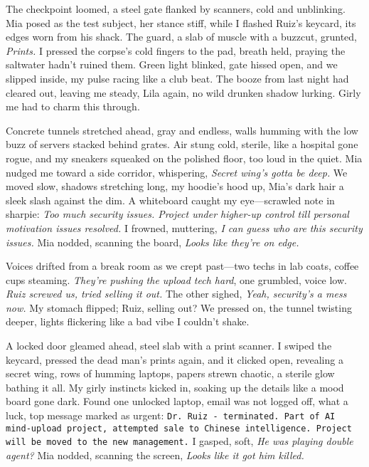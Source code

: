 \documentclass[12pt,oneside]{book} %
\newcommand{\note}[1]{\texttt{#1}}
\begin{document}
The checkpoint loomed, a steel gate flanked by scanners, cold and unblinking. Mia posed as the test subject, her stance stiff, while I flashed Ruiz’s keycard, its edges worn from his shack. The guard, a slab of muscle with a buzzcut, grunted, \textit{Prints.} I pressed the corpse’s cold fingers to the pad, breath held, praying the saltwater hadn’t ruined them. Green light blinked, gate hissed open, and we slipped inside, my pulse racing like a club beat. The booze from last night had cleared out, leaving me steady, Lila again, no wild drunken shadow lurking. Girly me had to charm this through.

Concrete tunnels stretched ahead, gray and endless, walls humming with the low buzz of servers stacked behind grates. Air stung cold, sterile, like a hospital gone rogue, and my sneakers squeaked on the polished floor, too loud in the quiet. Mia nudged me toward a side corridor, whispering, \textit{Secret wing’s gotta be deep.} We moved slow, shadows stretching long, my hoodie’s hood up, Mia’s dark hair a sleek slash against the dim. A whiteboard caught my eye—scrawled note in sharpie: \textit{Too much security issues. Project under higher-up control till personal motivation issues resolved.} I frowned, muttering, \textit{I can guess who are this security issues.} Mia nodded, scanning the board, \textit{Looks like they’re on edge.}

Voices drifted from a break room as we crept past—two techs in lab coats, coffee cups steaming. \textit{They’re pushing the upload tech hard}, one grumbled, voice low. \textit{Ruiz screwed us, tried selling it out.} The other sighed, \textit{Yeah, security’s a mess now.} My stomach flipped; Ruiz, selling out? We pressed on, the tunnel twisting deeper, lights flickering like a bad vibe I couldn’t shake.

A locked door gleamed ahead, steel slab with a print scanner. I swiped the keycard, pressed the dead man’s prints again, and it clicked open, revealing a secret wing, rows of humming laptops, papers strewn chaotic, a sterile glow bathing it all. My girly instincts kicked in, soaking up the details like a mood board gone dark. Found one unlocked laptop, email was not logged off, what a luck, top message marked as urgent: \note{Dr. Ruiz - terminated. Part of AI mind-upload project, attempted sale to Chinese intelligence. Project will be moved to the new management.} I gasped, soft, \textit{He was playing double agent?} Mia nodded, scanning the screen, \textit{Looks like it got him killed.}
\end{document}
